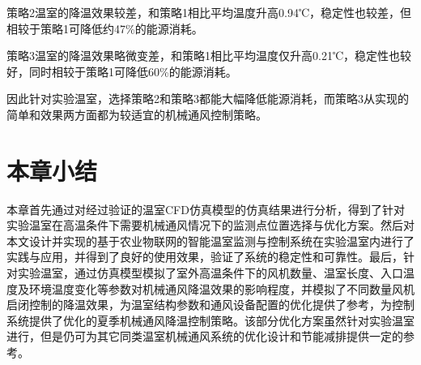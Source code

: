策略2温室的降温效果较差，和策略1相比平均温度升高0.94℃，稳定性也较差，但相较于策略1可降低约47\%的能源消耗。

策略3温室的降温效果略微变差，和策略1相比平均温度仅升高0.21℃，稳定性也较好，同时相较于策略1可降低60\%的能源消耗。

因此针对实验温室，选择策略2和策略3都能大幅降低能源消耗，而策略3从实现的简单和效果两方面都为较适宜的机械通风控制策略。

\section{本章小结}
本章首先通过对经过验证的温室CFD仿真模型的仿真结果进行分析，得到了针对实验温室在高温条件下需要机械通风情况下的监测点位置选择与优化方案。然后对本文设计并实现的基于农业物联网的智能温室监测与控制系统在实验温室内进行了实践与应用，并得到了良好的使用效果，验证了系统的稳定性和可靠性。最后，针对实验温室，通过仿真模型模拟了室外高温条件下的风机数量、温室长度、入口温度及环境温度变化等参数对机械通风降温效果的影响程度，并模拟了不同数量风机启闭控制的降温效果，为温室结构参数和通风设备配置的优化提供了参考，为控制系统提供了优化的夏季机械通风降温控制策略。该部分优化方案虽然针对实验温室进行，但是仍可为其它同类温室机械通风系统的优化设计和节能减排提供一定的参考。
